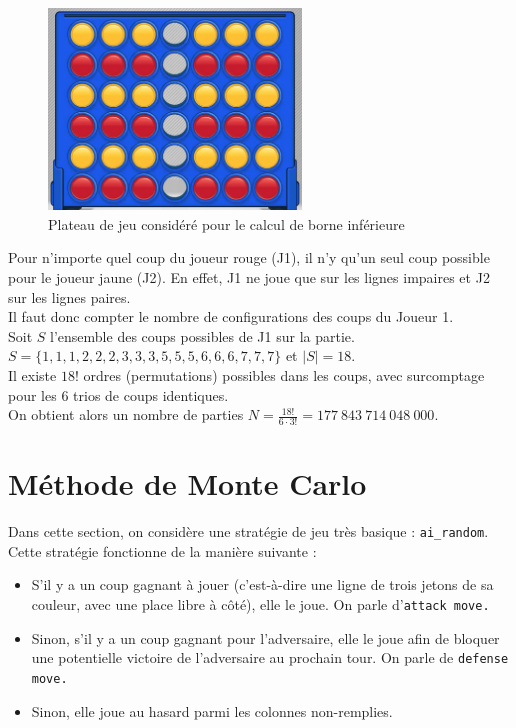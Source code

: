 \documentclass[11pt,answers]{exam}
\begin{document}
\begin{figure}[!h]
	\centering
	\includegraphics[width=0.6\textwidth]{board.png}
	\caption{Plateau de jeu considéré pour le calcul de borne inférieure}
	\label{fig:bound}
\end{figure}

\begin{solutionbox}{120mm}
	Pour n'importe quel coup du joueur rouge (J1), il n'y qu'un seul coup possible pour le joueur jaune (J2). En effet, J1 ne joue que sur les lignes impaires et J2 sur les lignes paires.\\
	Il faut donc compter le nombre de configurations des coups du Joueur 1.\\
	Soit $S$ l'ensemble des coups possibles de J1 sur la partie. $S = \{1, 1, 1, 2, 2, 2, 3, 3, 3, 5, 5, 5, 6, 6, 6, 7, 7, 7\}$ et $|S|=18$.\\
	Il existe $18!$ ordres (permutations) possibles dans les coups, avec surcomptage pour les 6 trios de coups identiques.\\
	On obtient alors un nombre de parties $N = \frac{18!}{6\cdot 3!} = 177~843~714~048~000$.

\end{solutionbox}

\newpage

\section{Méthode de Monte Carlo}

Dans cette section, on considère une stratégie de jeu très basique : \texttt{ai\_random}. Cette stratégie fonctionne de la manière suivante :
\begin{itemize}
	\item S'il y a un coup gagnant à jouer (c'est-à-dire une ligne de trois jetons de sa couleur, avec une place libre à côté), elle le joue. On parle d'\texttt{attack move.}
	\item Sinon, s'il y a un coup gagnant pour l'adversaire, elle le joue afin de bloquer une potentielle victoire de l'adversaire au prochain tour. On parle de \texttt{defense move.}
	\item Sinon, elle joue au hasard parmi les colonnes non-remplies.
\end{itemize}
\end{document}
